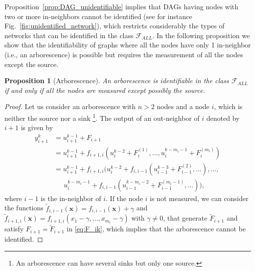 \documentclass[letterpaper,10pt,journal]{IEEEtran}
\newcommand{\Fzero}{\mathcal{F}_{ALL}}
\newcommand{\x}{\mathbf{x}}
\newtheorem{proposition}{Proposition}
\begin{document}
Proposition~\ref{prop:DAG_unidentifiable} implies that DAGs having nodes with two or more in-neighbors cannot be identified (see for instance Fig.~\ref{fig:unidentified_network}), which restricts considerably the types of networks that can be identified in the class $\Fzero$. In the following proposition we show that the identifiability of graphs where all the nodes have only 1 in-neighbor (i.e., an arborescence) is possible but requires the measurement of all the nodes except the source. 

\begin{proposition}[Arborescence]\label{prop:path_general_suff}
    An arborescence is identifiable in the class $\Fzero$ if and only if all the nodes are measured except possibly the source.
\end{proposition}
\begin{proof}
    Let us consider an arborescence with $n>2$ nodes and a node $i$, which is neither the source nor a sink \footnote{An arborescence can have several sinks but only one source.}. The output of an out-neighbor of $i$ denoted by $i+1$ is given by
\begin{align}
y_{i+1}^k&=u_{i+1}^{k-1}+F_{i+1}\label{eq:F_ik}\\
&=u_{i+1}^{k-1}+f_{i+1,i}(u_i^{k-2}+F_i^{(1)},\ldots,u_i^{k-m_i-1}+F_i^{(m_i)})\nonumber\\
&=u_{i+1}^{k-1}+f_{i+1,i}(u_i^{k-2}+f_{i,i-1}(u_{i-1}^{k-3}+F_{i-1}^{(2)},\ldots),\ldots, \nonumber\\
&\quad\:\: u_i^{k-m_i-1}+f_{i,i-1}(u_{i-1}^{k-m_i-2}+F_{i-1}^{(m_i-1)},\ldots)),\nonumber
\end{align}
where $i-1$ is the in-neighbor of $i$.
If the node $i$ is not measured, we can consider the functions $\tilde f_{i,i-1}(\x)=f_{i,i-1}(\x)+\gamma$ and $\tilde f_{i+1,i}(\x)=f_{i+1,i}(x_1-\gamma,\ldots,x_{m_i}-\gamma)$ with $\gamma\neq 0$, that generate $\tilde F_{i+1}$ and satisfy $F_{i+1}=\tilde F_{i+1}$ in \eqref{eq:F_ik}, which implies that the arborescence cannot be identified. 


\end{proof}
\end{document}
